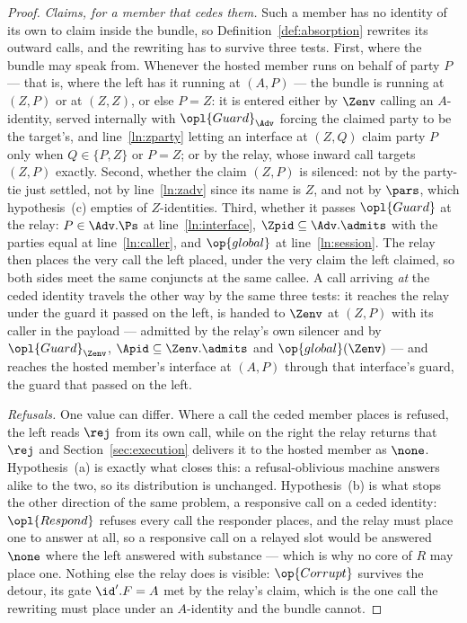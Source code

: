 \documentclass[10pt,oneside,openany]{book}
\theoremstyle{accentdef}
\theoremstyle{accentplain}
\begin{document}
\begin{proof}
\emph{Claims, for a member that cedes them.} Such a member has no identity of its own to claim inside
the bundle, so Definition~\ref{def:absorption} rewrites its outward calls, and the rewriting has to
survive three tests. First, where the bundle may speak from. Whenever the hosted member runs on behalf
of party $P$ --- that is, where the left has it running at $(A,P)$ --- the bundle is running at
$(Z,P)$ or at $(Z,Z)$, or else $P = Z$: it is entered either by $\Zenv$ calling an $A$-identity, served
internally with $\opl{Guard}_{\Adv}$ forcing the claimed party to be the target's, and
line~\ref{ln:zparty} letting an interface at $(Z,Q)$ claim party $P$ only when $Q \in \{P,Z\}$ or
$P = Z$; or by the relay, whose inward call targets $(Z,P)$ exactly. Second, whether the claim
$(Z,P)$ is silenced: not by the party-tie just settled, not by line~\ref{ln:zadv} since its name is
$Z$, and not by $\pars$, which hypothesis~(c) empties of $Z$-identities. Third, whether it passes
$\opl{Guard}$ at the relay: $P \in \Adv.\Ps$ at line~\ref{ln:interface}, $\Zpid \subseteq
\Adv.\admits$ with the parties equal at line~\ref{ln:caller}, and $\op{global}$ at
line~\ref{ln:session}. The relay then places the very call the left placed, under the very claim the
left claimed, so both sides meet the same conjuncts at the same callee. A call arriving \emph{at} the
ceded identity travels the other way by the same three tests: it reaches the relay under the guard it
passed on the left, is handed to $\Zenv$ at $(Z,P)$ with its caller in the payload --- admitted by the
relay's own silencer and by $\opl{Guard}_{\Zenv}$, $\Apid \subseteq \Zenv.\admits$ and
$\op{global}(\Zenv)$ --- and reaches the hosted member's interface at $(A,P)$ through that interface's
guard, the guard that passed on the left.

\emph{Refusals.} One value can differ. Where a call the ceded member places is refused, the left reads
$\rej$ from its own call, while on the right the relay returns that $\rej$ and
Section~\ref{sec:execution} delivers it to the hosted member as $\none$. Hypothesis~(a) is exactly
what closes this: a refusal-oblivious machine answers alike to the two, so its distribution is
unchanged. Hypothesis~(b) is what stops the other direction of the same problem, a responsive call on
a ceded identity: $\opl{Respond}$ refuses every call the responder places, and the relay must place
one to answer at all, so a responsive call on a relayed slot would be answered $\none$ where the left
answered with substance --- which is why no core of $R$ may place one. Nothing else the relay does
is visible: $\op{Corrupt}$ survives the detour, its gate $\id'.F = A$ met by the relay's claim, which
is the one call the rewriting must place under an $A$-identity and the bundle cannot.


\end{proof}
\end{document}
